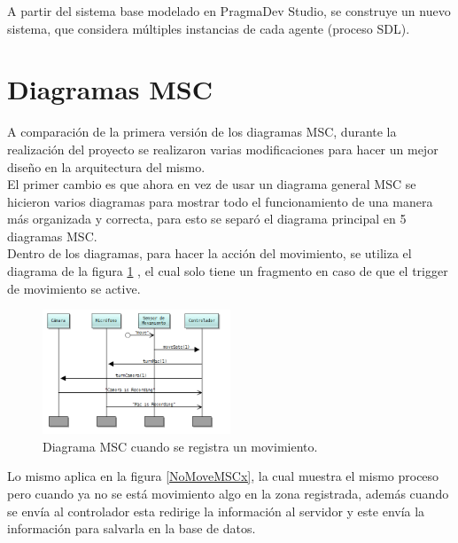 
A partir del sistema base modelado en PragmaDev Studio, se construye un nuevo sistema, que considera múltiples instancias de cada agente (proceso SDL).\\

\section{Diagramas MSC}

A comparación de la primera versión de los diagramas MSC, durante la realización del proyecto se realizaron varias modificaciones para hacer un mejor diseño en la arquitectura del mismo. \\

El primer cambio es que ahora en vez de usar un diagrama general MSC se hicieron varios diagramas para mostrar todo el funcionamiento de una manera más organizada y correcta, para esto se separó el diagrama principal en 5 diagramas MSC. \\

Dentro de los diagramas, para  hacer la acción del movimiento, se utiliza el diagrama de la figura \ref{MoveMSCx} , el cual solo tiene un fragmento en caso de que el trigger de movimiento se active.

\begin{figure}[h]
    \centering
    \includegraphics[width=0.5\textwidth]{images/Move_MSCx.png}
    \caption{Diagrama MSC cuando se registra un movimiento.}
    \label{MoveMSCx}
\end{figure}

\pagebreak

Lo mismo aplica en la figura \ref{NoMoveMSCx}, la cual muestra el mismo proceso pero cuando ya no se está movimiento algo en la zona registrada, además cuando se envía al controlador esta redirige la información al servidor y este envía la información para salvarla en la base de datos.


